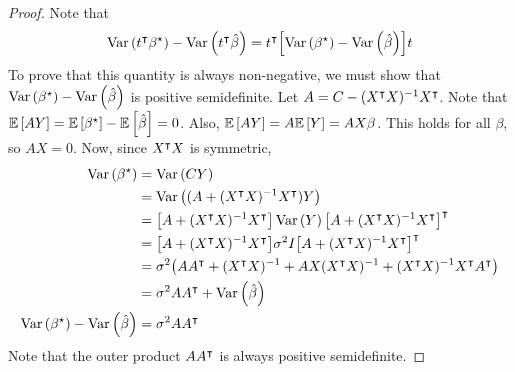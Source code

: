\begin{proof}
	Note that
	\[
		\operatorname{Var}\left({t^\intercal \beta^\star}\right) - \operatorname{Var}\left({t^\intercal \hat \beta}\right) = t^\intercal \qty[\operatorname{Var}\left({\beta^\star}\right) - \operatorname{Var}\left({\hat\beta}\right)] t
	\]
	To prove that this quantity is always non-negative, we must show that \( \operatorname{Var}\left({\beta^\star}\right) - \operatorname{Var}\left({\hat\beta}\right) \) is positive semidefinite.
	Let \( A = C - (X^\intercal X)^{-1} X^\intercal \).
	Note that \( \mathbb{E}\left[{AY}\right] = \mathbb{E}\left[{\beta^\star}\right] - \mathbb{E}\left[{\hat\beta}\right] = 0 \).
	Also, \( \mathbb{E}\left[{AY}\right] = A \mathbb{E}\left[{Y}\right] = AX\beta \).
	This holds for all \( \beta \), so \( AX = 0 \).
	Now, since \( X^\intercal X \) is symmetric,
	\begin{align*}
		\operatorname{Var}\left({\beta^\star}\right)                   & = \operatorname{Var}\left({CY}\right)                                                                                                                          \\
		                                    & = \operatorname{Var}\left({(A+(X^\intercal X)^{-1} X^\intercal)Y}\right)                                                                                     \\
		                                    & = \qty[A+(X^\intercal X)^{-1} X^\intercal] \operatorname{Var}\left({Y}\right) \qty[A+(X^\intercal X)^{-1} X^\intercal]^\intercal                           \\
		                                    & = \qty[A+(X^\intercal X)^{-1} X^\intercal] \sigma^2 I \qty[A+(X^\intercal X)^{-1} X^\intercal]^\intercal                       \\
		                                    & = \sigma^2 \qty(A A^\intercal + (X^\intercal X)^{-1} + AX(X^\intercal X)^{-1} + (X^\intercal X)^{-1} X^\intercal A^\intercal) \\
		                                    & = \sigma^2 AA^\intercal + \operatorname{Var}\left({\hat \beta}\right)                                                                                         \\
		\operatorname{Var}\left({\beta^\star}\right) - \operatorname{Var}\left({\hat\beta}\right) & = \sigma^2 AA^\intercal
	\end{align*}
	Note that the outer product \( A A^\intercal \) is always positive semidefinite.
\end{proof}

